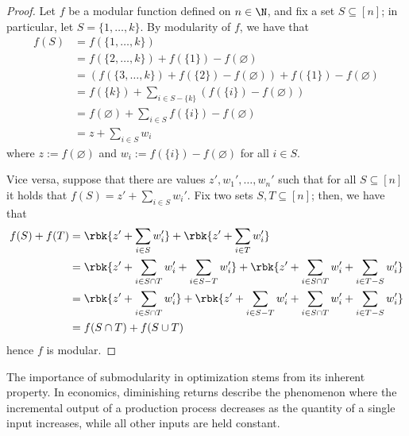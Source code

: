 \documentclass[a4paper, 12pt]{report}
\begin{document}
    \begin{proof}
        Let $f$ be a modular function defined on $n \in \N$, and fix a set $S \subseteq [n]$; in particular, let $S = \{1, \ldots, k\}$. By modularity of $f$, we have that
        \begin{equation*}
            \begin{split}
                f(S) &= f(\{1, \ldots, k\}) \\
                     &= f(\{2, \ldots, k\}) + f(\{1\}) - f(\varnothing) \\
                     &= (f(\{3, \ldots, k\}) + f(\{2\}) - f(\varnothing)) + f(\{1\}) - f(\varnothing) \\
                     &= f(\{k\}) + \sum_{i \in S - \{k\}}{(f(\{i\}) - f(\varnothing))} \\
                     &= f(\varnothing) + \sum_{i \in S}{f(\{i\}) - f(\varnothing)} \\
                     &= z + \sum_{i \in S}{w_i}
            \end{split}
        \end{equation*}
        where $z := f(\varnothing)$ and $w_i := f(\{i\}) - f(\varnothing)$ for all $i \in S$.

        Vice versa, suppose that there are values $z', w_1', \ldots, w_n'$ such that for all $S \subseteq [n]$ it holds that $f(S) = z' + \sum_{i \in S}{w_i'}$. Fix two sets $S, T \subseteq [n]$; then, we have that
        \begin{equation*}
            \begin{split}
                f(S) + f(T) &= \rbk{z' + \sum_{i \in S}{w_i'}} + \rbk{z' + \sum_{i \in T}{w_i'}} \\
                            &= \rbk{z' + \sum_{i \in S \cap T}{w_i'} + \sum_{i \in S - T}{w_i'}} + \rbk{z' + \sum_{i \in S \cap T}{w_i'} + \sum_{i \in T - S}{w_i'}} \\
                            &= \rbk{z' + \sum_{i \in S \cap T}{w_i'}} + \rbk{z' + \sum_{i \in S - T}{w_i'} + \sum_{i \in S \cap T}{w_i'} + \sum_{i \in T - S}{w_i'}} \\
                            &= f(S \cap T) + f(S \cup T)
            \end{split}
        \end{equation*}
        hence $f$ is modular.
    \end{proof}

    The importance of submodularity in optimization stems from its inherent  property. In economics, diminishing returns describe the phenomenon where the incremental output of a production process decreases as the quantity of a single input increases, while all other inputs are held constant.
\end{document}
